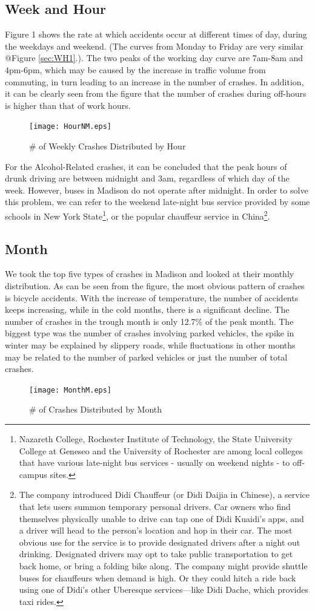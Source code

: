 \documentclass[15pt]{article}
\begin{document}
\subsection{Week and Hour}
\label{sec:WH}
Figure 1 shows the rate at which accidents occur at different times of day, during the weekdays and weekend. (The curves from Monday to Friday are very similar @Figure \ref{sec:WH1}.). The two peaks of the working day curve are 7am-8am and 4pm-6pm, which may be caused by the increase in traffic volume from commuting, in turn leading to an increase in the number of crashes. In addition, it can be clearly seen from the figure that the number of crashes during off-hours is higher than that of work hours.
\begin{figure}[H]
\centering
\texttt{[image: HourNM.eps]}
\caption{\# of Weekly Crashes Distributed by Hour}
\label{1}
\end{figure}
For the Alcohol-Related crashes, it can be concluded that the peak hours of drunk driving are between midnight and 3am, regardless of which day of the week. However, buses in Madison do not operate after midnight. In order to solve this problem, we can refer to the weekend late-night bus service provided by some schools in New York State\footnote{Nazareth College, Rochester Institute of Technology, the State University College at Geneseo and the University of Rochester are among local colleges that have various late-night bus services - usually on weekend nights - to off-campus sites.}, or the popular chauffeur service in China\footnote{The company introduced Didi Chauffeur (or Didi Daijia in Chinese), a service that lets users summon temporary personal drivers. Car owners who find themselves physically unable to drive can tap one of Didi Kuaidi's apps, and a driver will head to the person's location and hop in their car. The most obvious use for the service is to provide designated drivers after a night out drinking. Designated drivers may opt to take public transportation to get back home, or bring a folding bike along. The company might provide shuttle buses for chauffeurs when demand is high. Or they could hitch a ride back using one of Didi’s other Uberesque services—like Didi Dache, which provides taxi rides.}.

\subsection{Month}
We took the top five types of crashes in Madison and looked at their monthly distribution. As can be seen from the figure, the most obvious pattern of crashes is bicycle accidents. With the increase of temperature, the number of accidents keeps increasing, while in the cold months, there is a significant decline. The number of crashes in the trough month is only 12.7\% of the peak month. The biggest type was the number of crashes involving parked vehicles, the spike in winter may be explained by slippery roads, while fluctuations in other months may be related to the number of parked vehicles or just the number of total crashes.
\begin{figure}[H]
\centering
\texttt{[image: MonthM.eps]}
\caption{\# of Crashes Distributed by Month}
\end{figure}
\end{document}
